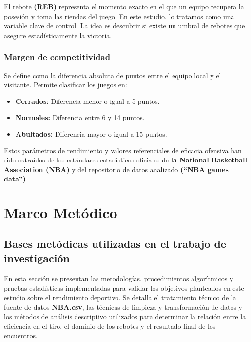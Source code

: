 \documentclass[oneside,11pt]{Latex/Classes/PhDthesisPSnPDF}
\begin{document}
El rebote \textbf{(REB)} representa el momento exacto en el que un
equipo recupera la posesión y toma las riendas del juego. En este
estudio, lo tratamos como una variable clave de control. La idea es
descubrir si existe un umbral de rebotes que asegure estadísticamente la
victoria.\\

\subsection{Margen de competitividad}

Se define como la diferencia absoluta de puntos entre el equipo local y
el visitante. Permite clasificar los juegos en:\\

\begin{itemize}
\item{\textbf{Cerrados:} Diferencia menor o igual a 5 puntos.}

\item{\textbf{Normales:} Diferencia entre 6 y 14 puntos.}

\item{\textbf{Abultados:} Diferencia mayor o igual a 15 puntos.}

\end{itemize}

Estos parámetros de rendimiento y valores referenciales de eficacia
ofensiva han sido extraídos de los estándares estadísticos oficiales de
\textbf{la National Basketball Association (NBA)} y del repositorio de
datos analizado \textbf{(``NBA games data'')}.\\

\chapter{Marco Metódico}

\section{Bases metódicas utilizadas en el trabajo de investigación}

En esta sección se presentan las metodologías, procedimientos
algorítmicos y pruebas estadísticas implementadas para validar los
objetivos planteados en este estudio sobre el rendimiento deportivo. Se
detalla el tratamiento técnico de la fuente de datos \textbf{NBA.csv},
las técnicas de limpieza y transformación de datos y los métodos de
análisis descriptivo utilizados para determinar la relación entre la
eficiencia en el tiro, el dominio de los rebotes y el resultado final de
los encuentros.\\
\end{document}

